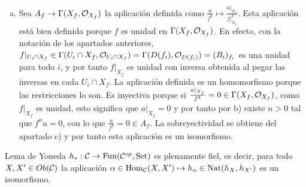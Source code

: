 \documentclass[twoside]{article}
\begin{document}
\begin{solucion}
\begin{enumerate}[(a)]
\item Sea $A_f\to\Gamma(X_f,{\mathcal O}_{X_f})$ la aplicación definida como $\frac{a}{f^k}\mapsto\frac{a|_{X_f}}{f|_{X_f}^k}$. Esta aplicación está bien definida porque $f$ es unidad en $\Gamma(X_f,{\mathcal O}_{X_f})$. En efecto, con la notación de los apartados anteriores, $f|_{U_i\cap X_f}\in \Gamma(U_i\cap X_f,{\mathcal O}_{U_i\cap X_f})=\Gamma(D(f_i), {\mathcal O}_{D(f_i)})=(B_i)_{f_i}$ es una unidad para todo $i$, y por tanto $f|_{X_f}$ es unidad con inversa obtenida al pegar las inversas en cada $U_i\cap X_f$. La aplicación definida es un homomorfismo porque las restricciones lo son. Es inyectiva porque si $\frac{a|_{X_f}}{f^k}=0\in \Gamma(X_f,{\mathcal O}_{X_f})$, como $f|_{X_f}$ es unidad, esto significa que $a|_{X_f}=0$ y por tanto por b) existe $n>0$ tal que $f^na=0$, con lo que $\frac{a}{f^k}=0\in A_f$. La sobreyectividad se obtiene del apartado c) y por tanto esta aplicación es un isomorfismo.
\end{enumerate}

\end{solucion}
%
\newpage
%
\begin{ejercicio}{Lema de Yoneda}
$h_*:{\mathcal C}\to \mathrm{Fun}({\mathcal C}^{op}, \mathrm{Set})$ es plenamente fiel, es decir, para todo $X,X'\in Ob({\mathcal C})$ la aplicación $\alpha\in\operatorname{Hom}_{{\mathcal C}}(X,X')\mapsto h_{\alpha}\in \mathrm{Nat}(h_X,h_{X'})$ es un isomorfismo. 
\end{ejercicio}
\end{document}
